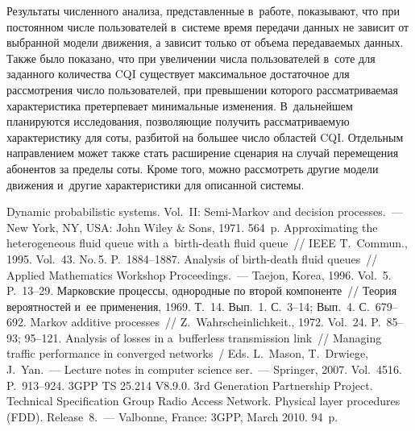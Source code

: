 \begin{multicols}{2}
  Результаты численного анализа, представленные в~работе, показывают, что 
при постоянном чис\-ле пользователей в~системе время передачи данных не 
зависит от выбранной модели движения, а зависит только от объема 
передаваемых данных. Также было показано, что при увеличении числа 
пользователей в~соте для заданного количества CQI существует максимальное 
достаточное для рассмотрения число пользователей, при превышении которого 
рассматриваемая характеристика претерпевает минимальные изменения. 
%
В~дальнейшем планируются исследования, позволяющие получить 
рассматриваемую характеристику для соты, разбитой на большее число 
областей CQI. Отдельным направлением может также стать расширение 
сценария на случай перемещения абонентов за пределы соты. Кроме того, 
можно рассмотреть другие модели движения и~другие характеристики для 
описанной системы.

  
{\small\frenchspacing
 {%
 \begin{thebibliography}{9}
 Dynamic probabilistic systems. Vol.~II: Semi-Markov and decision  
processes.~--- New York, NY, USA: John Wiley \& Sons, 1971. 564~p.
 Approximating the heterogeneous fluid queue with 
a~birth-death fluid queue~// IEEE T.~Commun., 1995. Vol.~43. No.\,5. P.~1884--1887.
 Analysis of birth-death fluid queues~// Applied 
Mathematics Workshop Proceedings.~--- Taejon, Korea, 1996. Vol.~5. P.~13--29.
 Марковские процессы, однородные по второй 
компоненте~// Теория вероятностей и~ее применения, 1969. Т.~14. Вып.~1. С.~3--14; Вып.~4. 
С.~679--692.
 Markov additive processes~// Z.~Wahrscheinlichkeit., 
1972. Vol.~24. P.~85--93; 95--121. 
 Analysis of losses in a~bufferless transmission link~// Managing traffic 
performance in converged networks~/ Eds.  L.~Mason, T.~Drwiege, J.~Yan.~--- Lecture notes in 
computer science ser.~--- Springer, 2007. Vol.~4516. P.~913--924.
3GPP TS 25.214 V8.9.0.  3rd Generation Partnership Project. Technical Specification 
Group Radio Access Network. Physical layer procedures (FDD). Release~8.~--- 
Valbonne, France: 3GPP, March 2010. 94~p.
 \end{thebibliography}

 }
 }

\end{multicols}

